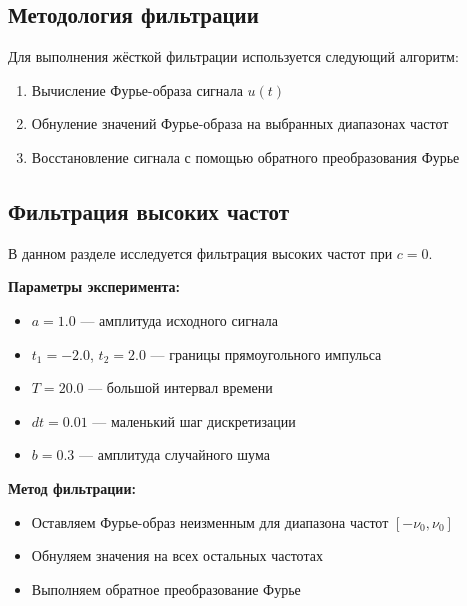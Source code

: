 \subsection*{Методология фильтрации}

Для выполнения жёсткой фильтрации используется следующий алгоритм:
\begin{enumerate}
    \item Вычисление Фурье-образа сигнала $u(t)$
    \item Обнуление значений Фурье-образа на выбранных диапазонах частот
    \item Восстановление сигнала с помощью обратного преобразования Фурье
\end{enumerate}

\subsection*{Фильтрация высоких частот}

В данном разделе исследуется фильтрация высоких частот при $c = 0$. 

\textbf{Параметры эксперимента:}
\begin{itemize}
    \item $a = 1.0$ — амплитуда исходного сигнала
    \item $t_1 = -2.0$, $t_2 = 2.0$ — границы прямоугольного импульса
    \item $T = 20.0$ — большой интервал времени
    \item $dt = 0.01$ — маленький шаг дискретизации
    \item $b = 0.3$ — амплитуда случайного шума
\end{itemize}

\textbf{Метод фильтрации:}
\begin{itemize}
    \item Оставляем Фурье-образ неизменным для диапазона частот $[-\nu_0, \nu_0]$
    \item Обнуляем значения на всех остальных частотах
    \item Выполняем обратное преобразование Фурье
\end{itemize}

